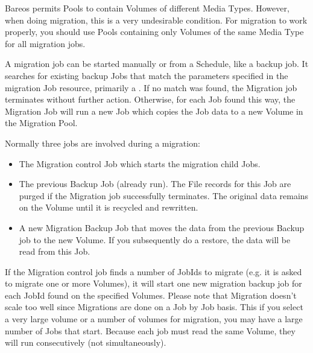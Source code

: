 Bareos permits Pools to contain Volumes of different Media Types.
However, when doing migration, this is a very undesirable condition.  For
migration to work properly, you should use Pools containing only Volumes of
the same Media Type for all migration jobs.

A migration job can be started manually or from a Schedule, like
a backup job. It searches for existing backup Jobs that match the
parameters specified in the migration Job resource, primarily a
. If no match was
found, the Migration job terminates without further action. Otherwise,
for each Job found this way, the Migration Job will run a new Job
which copies the Job data to a new Volume in the Migration Pool.

Normally three jobs are involved during a migration:

\begin{itemize}
\item The Migration control Job which starts the migration child Jobs.
\item The previous Backup Job (already run). The File records
      for this Job are purged if the Migration job successfully
      terminates.  The original data remains on the Volume until
      it is recycled and rewritten.
\item A new Migration Backup Job that moves the data from the
      previous Backup job to the new Volume.  If you subsequently
      do a restore, the data will be read from this Job.
\end{itemize}

If the Migration control job finds a number of JobIds to migrate (e.g.
it is asked to migrate one or more Volumes), it will start one new
migration backup job for each JobId found on the specified Volumes.
Please note that Migration doesn't scale too well since Migrations are
done on a Job by Job basis. This if you select a very large volume or
a number of volumes for migration, you may have a large number of
Jobs that start. Because each job must read the same Volume, they will
run consecutively (not simultaneously).



